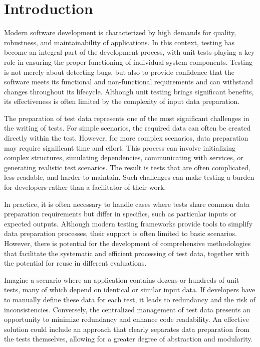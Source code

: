 
\chapter{Introduction\label{chap:introduction}}

Modern software development is characterized by high demands for quality, robustness, and maintainability of applications. In this context, testing has become an integral part of the development process, with unit tests playing a key role in ensuring the proper functioning of individual system components. Testing is not merely about detecting bugs, but also to provide confidence that the software meets its functional and non-functional requirements and can withstand changes throughout its lifecycle. Although unit testing brings significant benefits, its effectiveness is often limited by the complexity of input data preparation.

The preparation of test data represents one of the most significant challenges in the writing of tests. For simple scenarios, the required data can often be created directly within the test. However, for more complex scenarios, data preparation may require significant time and effort. This process can involve initializing complex structures, simulating dependencies, communicating with services, or generating realistic test scenarios. The result is tests that are often complicated, less readable, and harder to maintain. Such challenges can make testing a burden for developers rather than a facilitator of their work.

In practice, it is often necessary to handle cases where tests share common data preparation requirements but differ in specifics, such as particular inputs or expected outputs. Although modern testing frameworks provide tools to simplify data preparation processes, their support is often limited to basic scenarios. However, there is potential for the development of comprehensive methodologies that facilitate the systematic and efficient processing of test data, together with the potential for reuse in different evaluations.

Imagine a scenario where an application contains dozens or hundreds of unit tests, many of which depend on identical or similar input data. If developers have to manually define these data for each test, it leads to redundancy and the risk of inconsistencies. Conversely, the centralized management of test data presents an opportunity to minimize redundancy and enhance code readability. An effective solution could include an approach that clearly separates data preparation from the tests themselves, allowing for a greater degree of abstraction and modularity.

